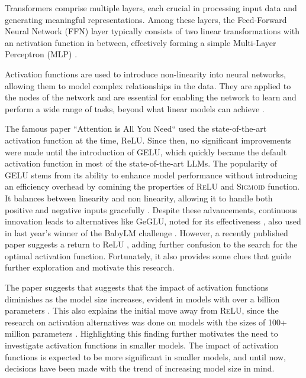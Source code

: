 Transformers comprise multiple layers, each crucial in processing input data and generating meaningful representations. Among these layers, the Feed-Forward Neural Network (FFN) layer typically consists of two linear transformations with an activation function in between, effectively forming a simple Multi-Layer Perceptron (MLP) \cite{geva_transformer_2022}.

Activation functions are used to introduce non-linearity into neural networks, allowing them to model complex relationships in the data. They are applied to the nodes of the network and are essential for enabling the network to learn and perform a wide range of tasks, beyond what linear models can achieve \cite{dubey2022activation}.

The famous paper ``Attention is All You Need“ \cite{Vaswani2017} used the state-of-the-art activation function at the time, ReLU. Since then, no significant improvements were made until the introduction of GELU, which quickly became the default activation function in most of the state-of-the-art LLMs. The popularity of GELU stems from its ability to enhance model performance without introducing an efficiency overhead by comining the properties of \textsc{ReLU} and \textsc{Sigmoid} function. It balances between linearity and non linearity, allowing it to handle both positive and negative inputs gracefully \cite{Hendrycks2023}. Despite these advancements, continuous innovation leads to alternatives like GeGLU, noted for its effectiveness \cite{Shazeer2020}, also used in last year's winner of the BabyLM challenge \cite{Samuel2023}. However, a recently published paper suggests a return to ReLU \cite{Mirzadeh2023}, adding further confusion to the search for the optimal activation function. Fortunately, it also provides some clues that guide further exploration and motivate this research.

The paper suggests that suggests that the impact of activation functions diminishes as the model size increases, evident in models with over a billion parameters \cite{Mirzadeh2023}. This also explains the initial move away from \textsc{ReLU}, since the research on activation alternatives was done on models with the sizes of 100+ million parameters \cite{Shazeer2020} \cite{Hendrycks2023}. Highlighting this finding further motivates the need to investigate activation functions in smaller models. The impact of activation functions is expected to be more significant in smaller models, and until now, decisions have been made with the trend of increasing model size in mind.

